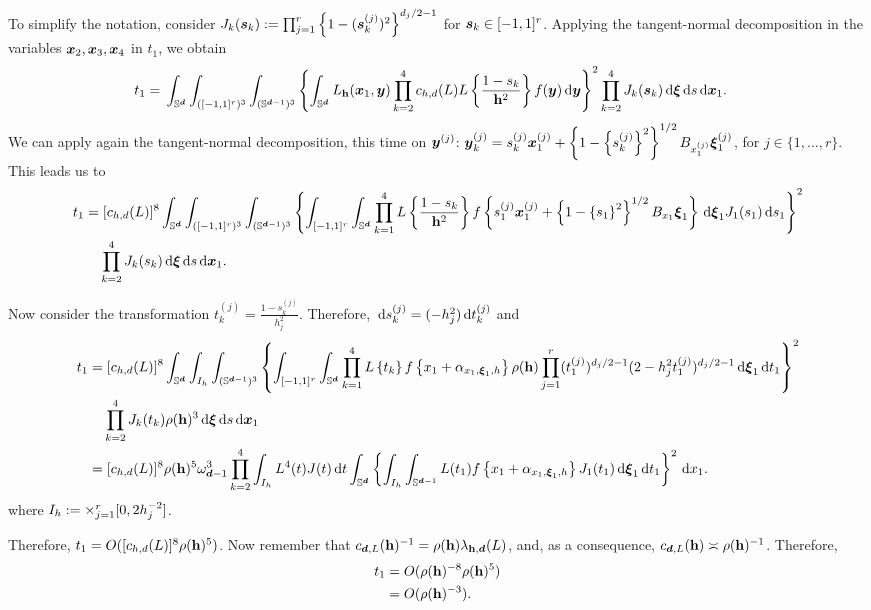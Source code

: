 \documentclass{article}
\begin{document}
To simplify the notation, consider $J_k(\boldsymbol{s}_k) := \prod_{j=1}^r \left\{1 - (\boldsymbol{s}_k^{(j)})^2\right\}^{d_j/2 -1}$ for $\boldsymbol{s}_k\in[-1,1]^r$. Applying the tangent-normal decomposition in the variables $\boldsymbol{x}_2,\boldsymbol{x}_3,\boldsymbol{x}_4$ in $t_1$, we obtain
\begin{align*}
    t_1 =&\; \int_{\mathbb{S}^{\boldsymbol{d}}} \int_{([-1,1]^r)^3} \int_{(\mathbb{S}^{\boldsymbol{d}-1})^3} \left\{ \int_{\mathbb{S}^{\boldsymbol{d}}}L_{\mathbf h} (\boldsymbol{x}_1,\boldsymbol{y}) \prod_{k=2}^{4} c_{h,d}(L) L \left\{ \frac{1 - s_k}{\mathbf h^2} \right\} f(\boldsymbol{y}) \,\mathrm{d} \boldsymbol{y} \right\}^2 \prod_{k=2}^{4} J_k(\boldsymbol{s}_k) \,\mathrm{d} \boldsymbol\xi \,\mathrm{d} s \,\mathrm{d} \boldsymbol{x}_1.
\end{align*}
We can apply again the tangent-normal decomposition, this time on $\boldsymbol{y}^{(j)}$: $\boldsymbol{y}_k^{(j)} = s_k^{(j)} \boldsymbol{x}_1^{(j)} + \left\{1 - \left\{s_k^{(j)}\right\}^2\right\}^{1/2} B_{x_1^{(j)}} \boldsymbol\xi_1^{(j)}$, for $j \in \{ 1, \dots, r \}$. This leads us to
\begin{align*}
    t_1 =&\; [c_{h,d}(L)]^8 \int_{\mathbb{S}^{\boldsymbol{d}}} \int_{([-1,1]^r)^3} \int_{(\mathbb{S}^{\boldsymbol{d}-1})^3} \left\{ \int_{[-1,1]^r} \int_{\mathbb{S}^{\boldsymbol{d}}} \prod_{k=1}^{4} L \left\{ \frac{1 - s_k}{\mathbf h^2} \right\} f \left\{ s_1^{(j)} \boldsymbol{x}_1^{(j)} + \left\{1 - \left\{s_1\right\}^2\right\}^{1/2} B_{x_1} \boldsymbol\xi_1 \right\} \,\mathrm{d} \boldsymbol\xi_1 J_1(s_1) \,\mathrm{d} s_1 \right\}^2 \\
    & \prod_{k=2}^{4} J_k(s_k) \,\mathrm{d} \boldsymbol\xi \,\mathrm{d} s \,\mathrm{d} \boldsymbol{x}_1.
\end{align*}

Now consider the transformation $t_k^{(j)} = \frac{1 - s_k^{(j)}}{h_j^2}$. Therefore, $\,\mathrm{d} s_k^{(j)} = (-h_j^2) \,\mathrm{d} t_k^{(j)}$ and
\begin{align*}
    t_1 =&\; [c_{h,d}(L)]^8 \int_{\mathbb{S}^{\boldsymbol{d}}} \int_{I_h} \int_{(\mathbb{S}^{\boldsymbol{d}-1})^3} \left\{ \int_{[-1,1]^r} \int_{\mathbb{S}^{\boldsymbol{d}}} \prod_{k=1}^{4} L \left\{ t_k\right\} f \left\{ x_1 + \alpha_{x_1,\boldsymbol\xi_1,h} \right\} \rho (\mathbf h) \prod_{j=1}^r (t_1^{(j)})^{d_j/2 -1} (2 -h_j^2 t_1^{(j)})^{d_j/2 -1} \,\mathrm{d} \boldsymbol\xi_1 \,\mathrm{d} t_1 \right\}^2 \\
    & \prod_{k=2}^{4} J_k(t_k) \rho (\mathbf h)^3 \,\mathrm{d} \boldsymbol\xi \,\mathrm{d} s \,\mathrm{d} \boldsymbol{x}_1 \\
    =&\; [c_{h,d}(L)]^8 \rho (\mathbf h)^5 \omega_{\boldsymbol{d} - 1}^3 \prod_{k=2}^4 \int_{I_h} L^4(t) J(t) \,\mathrm{d} t \int_{\mathbb{S}^{\boldsymbol{d}}} \left\{ \int_{I_h} \int_{\mathbb{S}^{\boldsymbol{d}-1}} L(t_1)  f \left\{ x_1 + \alpha_{x_1,\boldsymbol\xi_1,h} \right\} J_1(t_1) \,\mathrm{d} \boldsymbol\xi_1 \,\mathrm{d} t_1 \right\}^2 \,\mathrm{d} x_1.
\end{align*}
where $I_h := \times_{j=1}^r [0, 2h_j^{-2}]$.

Therefore, $t_1 = O([c_{h,d}(L)]^8 \rho (\mathbf h)^5)$. Now remember that $c_{\boldsymbol{d},L}(\mathbf h)^{-1} = \rho(\mathbf h) \lambda_{\mathbf h,\boldsymbol{d}}(L)$, and, as a consequence, $c_{\boldsymbol{d},L}(\mathbf h) \asymp \rho(\mathbf h)^{-1}$. Therefore,
\begin{align*}
    t_1 &= O(\rho (\mathbf h)^{-8} \rho (\mathbf h)^5) \\
    &= O(\rho (\mathbf h)^{-3}).
\end{align*}
\end{document}
